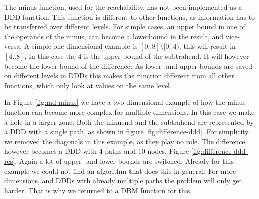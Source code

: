 The minus function, used for the reachability, has not been implemented as a DDD function. This function is different to other functions, as information has to be transferred over different levels. For simple cases, an upper bound in one of the operands of the minus, can become a lowerbound in the result, and vice-versa. A simple one-dimensional example is $[0..8] \setminus [0..4)$, this will result in $[4..8]$. In this case the 4 is the upper-bound of the subtrahend. It will however become the lower-bound of the difference. As lower- and upper-bounds are saved on different levels in DDDs this makes the function different from all other functions, which only look at values on the same level.

In Figure \ref{fig:md-minus} we have a two-dimensional example of how the minus function can become more complex for multiple-dimensions. In this case we make a hole in a larger zone. Both the minuend and the subtrahend are represented by a DDD with a single path, as shown in figure \ref{fig:difference-ddd}. For simplicity we removed the diagonals in this example, as they play no role. The difference however becomes a DDD with 4 paths and 10 nodes, Figure \ref{fig:difference-ddd-res}. Again a lot of upper- and lower-bounds are switched. Already for this example we could not find an algorithm that does this in general. For more dimensions, and DDDs with already multiple paths the problem will only get harder. That is why we returned to a DBM function for this.

